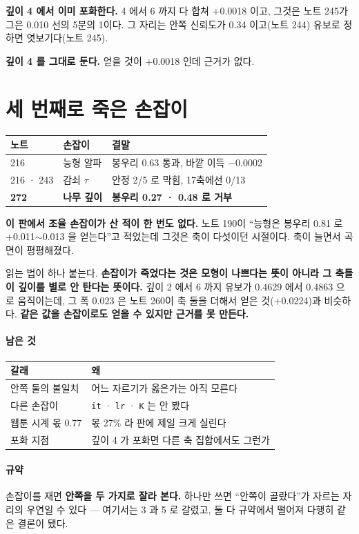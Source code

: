 \documentclass[10pt]{article}
\begin{document}
\textbf{깊이 4 에서 이미 포화한다.} 4 에서 6 까지 다 합쳐 $+$0.0018 이고,
그것은 노트 245가 그은 0.010 선의 5분의 1이다. 그 자리는 안쪽 신뢰도가
0.34 이고(노트 244) 유보로 정하면 엿보기다(노트 245).

\textbf{깊이 4 를 그대로 둔다.} 얻을 것이 $+$0.0018 인데 근거가 없다.

\section{세 번째로 죽은 손잡이}

\begin{center}\small
\begin{tabular}{lll}
\hline
노트 & 손잡이 & 결말 \\
\hline
216 & 능형 알파 & 봉우리 0.63 통과, 바깥 이득 $-$0.0002 \\
216 · 243 & 감쇠 $\tau$ & 안정 2/5 로 막힘, 17축에선 0/13 \\
\textbf{272} & \textbf{나무 깊이} & \textbf{봉우리 0.27 · 0.48 로 거부} \\
\hline
\end{tabular}
\end{center}

\textbf{이 판에서 조율 손잡이가 산 적이 한 번도 없다.} 노트 190이 ``능형은
봉우리 0.81 로 $+$0.011$\sim$0.013 을 얻는다''고 적었는데 그것은 축이
다섯이던 시절이다. 축이 늘면서 곡면이 평평해졌다.

읽는 법이 하나 붙는다. \textbf{손잡이가 죽었다는 것은 모형이 나쁘다는 뜻이
아니라 그 축들이 깊이를 별로 안 탄다는 뜻이다.} 깊이 2 에서 6 까지 유보가
0.4629 에서 0.4863 으로 움직이는데, 그 폭 0.023 은 노트 260이 축 둘을
더해서 얻은 것($+$0.0224)과 비슷하다. \textbf{같은 값을 손잡이로도 얻을 수
있지만 근거를 못 만든다.}

\paragraph{남은 것}
\begin{center}\small
\begin{tabular}{ll}
\hline
갈래 & 왜 \\
\hline
안쪽 둘의 불일치 & 어느 자르기가 옳은가는 아직 모른다 \\
다른 손잡이 & \texttt{it} · \texttt{lr} · \texttt{K} 는 안 봤다 \\
웹툰 시계 몫 0.77 & 몫 27\% 라 판에 제일 크게 실린다 \\
포화 지점 & 깊이 4 가 포화면 다른 축 집합에서도 그런가 \\
\hline
\end{tabular}
\end{center}

\paragraph{규약} 손잡이를 재면 \textbf{안쪽을 두 가지로 잘라 본다.} 하나만
쓰면 ``안쪽이 골랐다''가 자르는 자리의 우연일 수 있다 --- 여기서는 3 과 5 로
갈렸고, 둘 다 규약에서 떨어져 다행히 같은 결론이 됐다.
\end{document}
